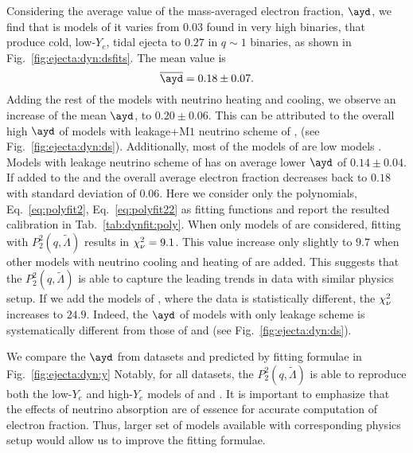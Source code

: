 Considering the average value of the mass-averaged electron fraction, $\ayd$, we find 
that is models of \DSrefset{} it varies from $0.03$ found in very high \mr{} binaries,
that produce cold, low-$Y_e$, tidal ejecta \citep{Bernuzzi:2020tgt} to $0.27$ in $q\sim1$ 
binaries, as shown in Fig.~\ref{fig:ejecta:dyn:dsfits}.
%
The mean value is 
%
\begin{equation}
\label{eq:ejecta:dyn:avg:y}
\overline{\ayd} = 0.18 \pm 0.07.
\end{equation}
%
Adding the rest of the models with neutrino heating and cooling, \DSheatcool{} we observe
an increase of the mean $\ayd$, to $0.20 \pm 0.06$. This can be attributed to the overall 
high $\ayd$ of models with leakage+M$1$ neutrino scheme of 
\citet{Sekiguchi:2015dma,Sekiguchi:2016bjd}, (see Fig.~\ref{fig:ejecta:dyn:ds}).
Additionally, most of the models of \DSheatcool{} are low \mr{} models 
\citep[\eg][]{Vincent:2019kor}.
%
Models with leakage neutrino scheme of \DScool{} has on average lower 
$\ayd$ of $0.14 \pm 0.04$. If added to the \DSheatcool{} and \DSrefset{} the overall average 
electron fraction decreases back to $0.18$ with standard deviation of $0.06$.
%
Here we consider only the polynomials, Eq.~\ref{eq:polyfit2}, Eq.~\ref{eq:polyfit22} as fitting 
functions and report the resulted calibration in Tab.~\ref{tab:dynfit:poly}.
When only models of \DSrefset{} are considered, fitting with $P_2^2(q,\tilde{\Lambda})$ 
results in $\chi_{\nu}^2=9.1$. This value increase only slightly to $9.7$ when other models with 
neutrino cooling and heating of \DSheatcool{} are added. This suggests that the 
$P_2^2(q,\tilde{\Lambda})$ is able to capture the leading trends in data with similar 
physics setup. If we add the models of \DScool{}, where the data is statistically different, 
the $\chi_{\nu}^2$ increases to $24.9$. Indeed, the $\ayd$ of models with only leakage scheme 
is systematically different from those of \DSheatcool{} and \DSrefset{} 
(see Fig.~\ref{fig:ejecta:dyn:ds}).

We compare the $\ayd$ from datasets and predicted by fitting formulae in 
Fig.~\ref{fig:ejecta:dyn:y} Notably, for all datasets, the $P_2^2(q,\tilde\Lambda)$ is able to 
reproduce both the low-$Y_e$ and high-$Y_e$ models of \DSheatcool{} and \DSrefset{}.
It is important to emphasize that the effects of neutrino absorption are of essence for accurate
computation of electron fraction. Thus, larger set of models available with corresponding 
physics setup would allow us to improve the fitting formulae.

